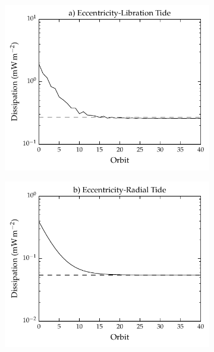 \begin{figure}[!t]
\centering
\begin{subfigure}{\linewidth}
\centering
\includegraphics[width=0.85\linewidth]{Figures/ecc_lib_diss}
\subcaption{\label{fig:diss_a}}
\end{subfigure}\vspace*{-0.7cm}
\begin{subfigure}{\linewidth}
\centering
\includegraphics[width=0.85\linewidth]{Figures/ecc_rad_diss}
\subcaption{\label{fig:diss_b}}
\end{subfigure}\vspace*{-0.7cm}
\begin{subfigure}{\linewidth}
\centering

\end{subfigure}
\end{figure}
